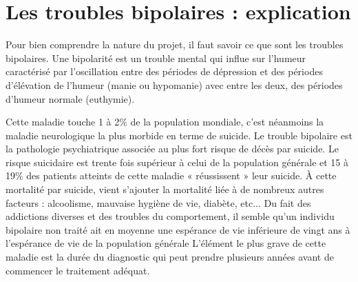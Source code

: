 \section{Les troubles bipolaires : explication}

Pour bien comprendre la nature du projet, il faut savoir ce que sont les troubles bipolaires.
Une bipolarité est un trouble mental qui influe sur l'humeur caractérisé par l'oscillation entre des périodes de dépression et des périodes d'élévation de l'humeur (manie ou hypomanie) avec entre les deux,
des périodes d'humeur \og{} normale \fg{} (euthymie).

Cette maladie touche 1 à 2\% de la population mondiale, c'est néanmoins la maladie neurologique la plus morbide en terme de suicide. Le trouble bipolaire est la pathologie psychiatrique associée au plus fort risque de décès par suicide. Le risque suicidaire est trente fois supérieur à celui de la population générale et 15 à 19\% des patients atteints de cette maladie « réussissent » leur suicide. À cette mortalité par suicide, vient s’ajouter la mortalité liée à de nombreux autres facteurs :  alcoolisme, mauvaise hygiène de vie, diabète, etc... Du fait des addictions diverses et des troubles du comportement, il semble qu’un individu bipolaire non traité ait en moyenne une espérance de vie inférieure de vingt ans à l’espérance de vie de la population générale
L'élément le plus grave de cette maladie est la durée du diagnostic qui peut prendre plusieurs années avant de commencer le traitement adéquat. 
